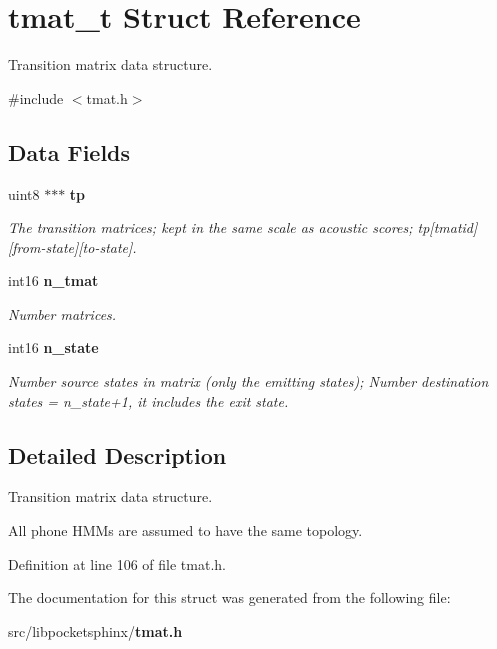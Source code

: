 \section{tmat\+\_\+t Struct Reference}
\label{structtmat__t}


Transition matrix data structure.  




{\ttfamily \#include $<$tmat.\+h$>$}

\subsection*{Data Fields}
\begin{DoxyCompactItemize}
\item 
uint8 $\ast$$\ast$$\ast$ {\bf tp}\label{structtmat__t_a9f518c96b30dab9efdb69bd779a7b5bf}

\begin{DoxyCompactList}\small\item\em The transition matrices; kept in the same scale as acoustic scores; tp[tmatid][from-\/state][to-\/state]. \end{DoxyCompactList}\item 
int16 {\bf n\+\_\+tmat}\label{structtmat__t_ada644af34d54256f1574870d5f7a6788}

\begin{DoxyCompactList}\small\item\em Number matrices. \end{DoxyCompactList}\item 
int16 {\bf n\+\_\+state}\label{structtmat__t_a3633c71659e30cf23bee1f7efb4b4805}

\begin{DoxyCompactList}\small\item\em Number source states in matrix (only the emitting states); Number destination states = n\+\_\+state+1, it includes the exit state. \end{DoxyCompactList}\end{DoxyCompactItemize}


\subsection{Detailed Description}
Transition matrix data structure. 

All phone H\+M\+Ms are assumed to have the same topology. 

Definition at line 106 of file tmat.\+h.



The documentation for this struct was generated from the following file\+:\begin{DoxyCompactItemize}
\item 
src/libpocketsphinx/{\bf tmat.\+h}\end{DoxyCompactItemize}
